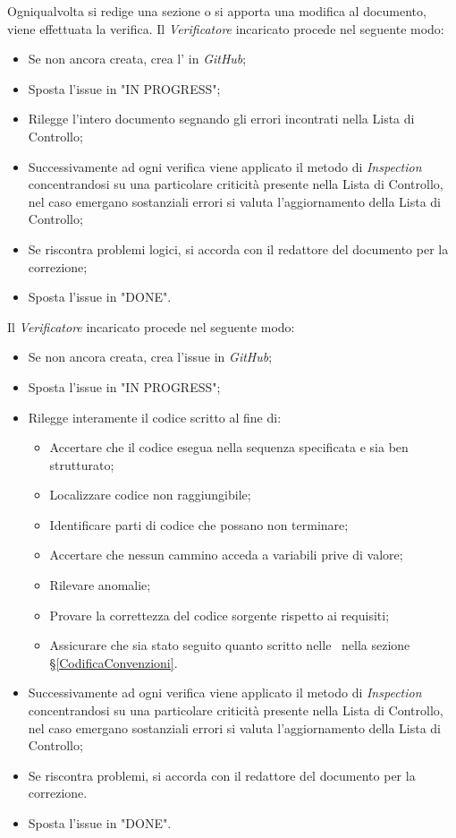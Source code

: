 \label{VerificaDocumentazione}Ogniqualvolta si redige una sezione o si apporta una modifica al documento, viene effettuata la verifica.
Il \textit{Verificatore} incaricato procede nel seguente modo:
\begin{itemize}
	\item Se non ancora creata, crea l' in \textit{GitHub};
	\item Sposta l'issue in "IN PROGRESS";
	\item Rilegge l'intero documento segnando gli errori incontrati nella Lista di Controllo;
	\item Successivamente ad ogni verifica viene applicato il metodo di \textit{Inspection} concentrandosi su una particolare criticità presente nella Lista di Controllo, nel caso emergano sostanziali errori si valuta l'aggiornamento della Lista di Controllo;
	\item Se riscontra problemi logici, si accorda con il redattore del documento per la correzione;
	\item Sposta l'issue in "DONE".
\end{itemize}

\label{VerificaCodice}Il \textit{Verificatore} incaricato procede nel seguente modo:
\begin{itemize}
	\item Se non ancora creata, crea l'issue in \textit{GitHub};
	\item Sposta l'issue in "IN PROGRESS";
	\item Rilegge interamente il codice scritto al fine di:
	\begin{itemize}
		\item Accertare che il codice esegua nella sequenza specificata e sia ben strutturato;
		\item Localizzare codice non raggiungibile;
		\item Identificare parti di codice che possano non terminare;
		\item Accertare che nessun cammino acceda a variabili prive di valore;
		\item Rilevare anomalie;
		\item Provare la correttezza del codice sorgente rispetto ai requisiti;
		\item Assicurare che sia stato seguito quanto scritto nelle \NdPv\ nella sezione \S\ref{CodificaConvenzioni}.
	\end{itemize}
	\item Successivamente ad ogni verifica viene applicato il metodo di \textit{Inspection} concentrandosi su una particolare criticità presente nella Lista di Controllo, nel caso emergano sostanziali errori si valuta l'aggiornamento della Lista di Controllo;
	\item Se riscontra problemi, si accorda con il redattore del documento per la correzione. 
	\item Sposta l'issue in "DONE".
\end{itemize}

